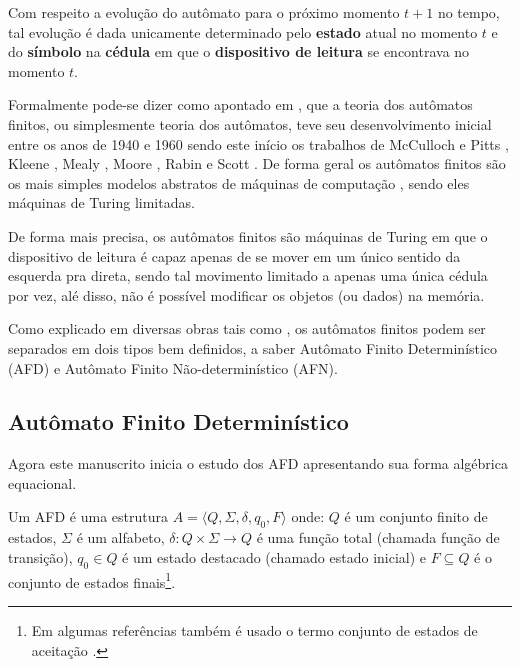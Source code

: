 Com respeito a evolução do autômato para o próximo momento $t+1$ no tempo, tal evolução é dada unicamente determinado pelo \textbf{estado} atual no momento $t$ e do \textbf{símbolo} na \textbf{cédula} em que o \textbf{dispositivo de leitura} se encontrava no momento $t$. 

Formalmente pode-se dizer como apontado em \cite{valdi2020phd}, que a teoria dos autômatos finitos, ou simplesmente teoria dos autômatos, teve seu desenvolvimento inicial entre os anos de 1940 e 1960 sendo este início os trabalhos de McCulloch e Pitts \cite{mcculloch1943}, Kleene \cite{kleene1951}, Mealy \cite{mealy1955}, Moore \cite{moore1956}, Rabin e Scott \cite{rabin1963, rabin1959}. De forma geral os autômatos finitos são os mais simples modelos abstratos de máquinas de computação \cite{farias2017}, sendo eles máquinas de Turing limitadas. 

De forma mais precisa, os autômatos finitos são máquinas de Turing \cite{turing1937} em que o dispositivo de leitura é capaz apenas de se mover em um único sentido da esquerda pra direta, sendo tal movimento limitado a apenas uma única cédula por vez, alé disso, não é possível modificar os objetos (ou dados) na memória.

Como explicado em diversas obras tais como \cite{benjaLivro2010, hopcroft2008, linz2006, menezes1998LFA}, os autômatos finitos podem ser separados em dois tipos bem definidos, a saber Autômato Finito Determinístico (AFD) e Autômato Finito Não-determinístico (AFN).

\subsection{Autômato Finito Determinístico}\label{subsec:AFD}

Agora este manuscrito inicia o estudo dos AFD apresentando sua forma algébrica equacional.

\begin{definition}\label{def:AFD}
	Um AFD é uma estrutura $A = \langle Q, \Sigma, \delta, q_0, F\rangle$ onde: $Q$ é um conjunto finito de estados, $\Sigma$ é um alfabeto, $\delta : Q \times \Sigma \rightarrow Q$ é uma função total (chamada função de transição), $q_0 \in Q$ é um estado destacado (chamado estado inicial) e $F \subseteq Q$ é o conjunto de estados finais\footnote{Em algumas referências também é usado o termo conjunto de estados de aceitação \cite{de2010}.}.
\end{definition}

